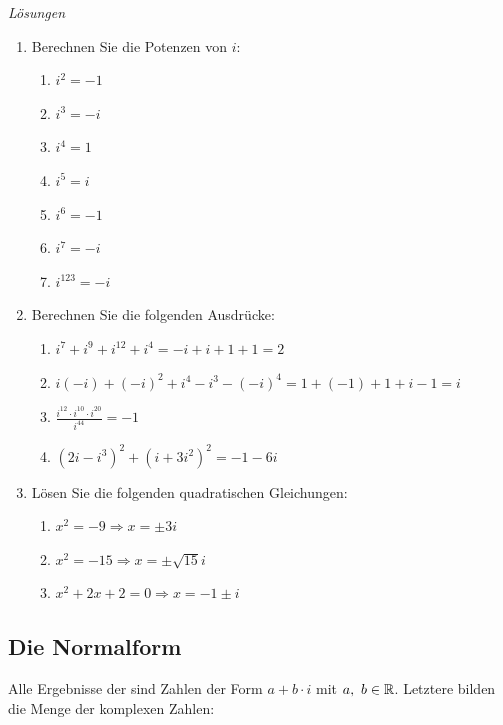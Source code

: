 \clearpage
\emph{Lösungen}
\begin{enumerate}
\item Berechnen Sie die Potenzen von $i$:
    \begin{enumerate}
        \item $i^2= -1$
        \item $i^3= -i$
        \item $i^4= 1$
        \item $i^5= i$
        \item $i^6= -1$
        \item $i^7= -i$
        \item $i^{123}= -i$
    \end{enumerate}
    
    \item Berechnen Sie die folgenden Ausdrücke:
    \begin{enumerate}
        \item $i^7 + i^9 + i^{12} + i^4 = -i +i +1 +1 = 2$
        \item $i(-i) + (-i)^2 + i^4 - i^3 - (-i)^4 = 1 + (-1) + 1 + i -1 = i$
        \item $\frac{i^{12} \cdot i^{10} \cdot i^{20}}{i^{44}} = -1$
        \item $(2i - i^3)^2 + (i + 3i^2)^2 = -1-6i$
    \end{enumerate}
    
    \item Lösen Sie die folgenden quadratischen Gleichungen:
    \begin{enumerate}
        \item $x^2 = -9 \Rightarrow x = \pm 3i$
        \item $x^2 = -15 \Rightarrow x = \pm \sqrt{15}i$
        \item $x^2 + 2x + 2 = 0 \Rightarrow x = -1 \pm i$
    \end{enumerate}
\end{enumerate}
















\clearpage
\subsection{Die Normalform}
Alle Ergebnisse der  sind Zahlen der Form $a+b\cdot i$ mit $a,\ b\in \mathbb{R}$. Letztere bilden die Menge der komplexen Zahlen:

